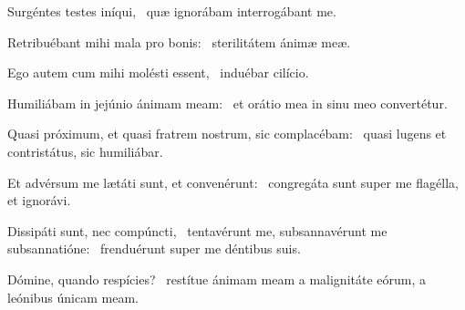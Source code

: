 
\item Surgéntes testes iníqui,~\psstar{} quæ ignorábam interrogábant me.

\item Retribuébant mihi mala pro bonis:~\psstar{} sterilitátem ánimæ meæ.

\item Ego autem cum mihi molésti essent,~\psstar{} induébar cilício.

\item Humiliábam in jejúnio ánimam meam:~\psstar{} et orátio mea in sinu meo convertétur.

\item Quasi próximum, et quasi fratrem nostrum, sic complacébam:~\psstar{} quasi lugens et contristátus, sic humiliábar.

\item Et advérsum me lætáti sunt, et convenérunt:~\psstar{} congregáta sunt super me flagélla, et ignorávi.

\item Dissipáti sunt, nec compúncti,~\pscross{} tentavérunt me, subsannavérunt me subsannatióne:~\psstar{} frenduérunt super me déntibus suis.

\item Dómine, quando respícies?~\psstar{} restítue ánimam meam a malignitáte eórum, a leónibus únicam meam.
